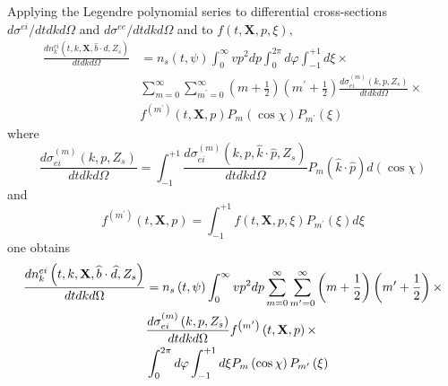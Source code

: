 Applying the Legendre polynomial series to differential cross-sections $%
d\sigma ^{ei}/dtdkd\Omega $ and $d\sigma ^{ee}/dtdkd\Omega $ and to $f\left(
t,\mathbf{X},p,\xi \right) ,$
\begin{align}
\frac{dn_{k}^{ei}\left( t,k,\mathbf{X},\widehat{b}\cdot \widehat{d}%
,Z_{s}\right) }{dtdkd\Omega }& =n_{s}\left( t,\psi \right) \int_{0}^{\infty %
}vp^{2}dp\int_{0}^{2\pi }d\varphi \int_{-1}^{+1}d\xi \times   \nonumber \\
& \sum_{m=0}^{\infty }\sum_{m^{\prime }=0}^{\infty }\left( m+\frac{1}{2}%
\right) \left( m^{\prime }+\frac{1}{2}\right) \frac{d\sigma _{ei}^{\left(
m\right) }\left( k,p,Z_{s}\right) }{dtdkd\Omega }\times   \nonumber \\
& f^{\left( m^{\prime }\right) }\left( t,\mathbf{X},p\right) P_{m}\left(
\cos \chi \right) P_{m^{\prime }}\left( \xi \right)
\end{align}
where
\begin{equation}
\frac{d\sigma _{ei}^{\left( m\right) }\left( k,p,Z_{s}\right) }{dtdkd\Omega }%
=\int_{-1}^{+1}\frac{d\sigma _{ei}^{\left( m\right) }\left( k,p,\widehat{k}%
\cdot \widehat{p},Z_{s}\right) }{dtdkd\Omega }P_{m}\left( \widehat{k}\cdot
\widehat{p}\right) d\left( \cos \chi \right)
\end{equation}
and
\begin{equation}
f^{\left( m^{\prime }\right) }\left( t,\mathbf{X},p\right)
=\int_{-1}^{+1}f\left( t,\mathbf{X},p,\xi \right) P_{m^{\prime }}\left( \xi
\right) d\xi
\end{equation}
one obtains
\begin{align}
\frac{dn_{k}^{ei}\left( t,k,\mathbf{X},\widehat{b}\cdot \widehat{d}%
,Z_{s}\right) }{dtdkd\Omega }& =n_{s}\left( t,\psi \right) \int_{0}^{\infty %
}vp^{2}dp\sum_{m=0}^{\infty }\sum_{m^{\prime }=0}^{\infty }\left( m+\frac{1}{%
2}\right) \left( m^{\prime }+\frac{1}{2}\right) \times   \nonumber \\
& \frac{d\sigma _{ei}^{\left( m\right) }\left( k,p,Z_{s}\right) }{dtdkd%
\Omega }f^{\left( m^{\prime }\right) }\left( t,\mathbf{X},p\right) \times
\nonumber \\
& \int_{0}^{2\pi }d\varphi \int_{-1}^{+1}d\xi P_{m}\left( \cos \chi \right)
P_{m^{\prime }}\left( \xi \right)   \label{LegendreProj1}
\end{align}

